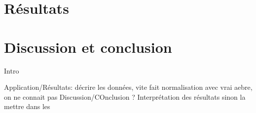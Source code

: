 \documentclass[a4paper, 12pt]{article}\usepackage[]{graphicx}\usepackage[]{xcolor}
\begin{document}
\section{Résultats}
\label{sec:results}



\section{Discussion et conclusion}
\label{sec:discuss_conclusion}

Intro

Application/Résultats: décrire les données, vite fait normalisation avec vrai aebre, on ne connait pas 
Discussion/COnclusion ? Interprétation des résultats sinon la mettre dans les 

\printbibliography
\nocite{*}

\end{document}

